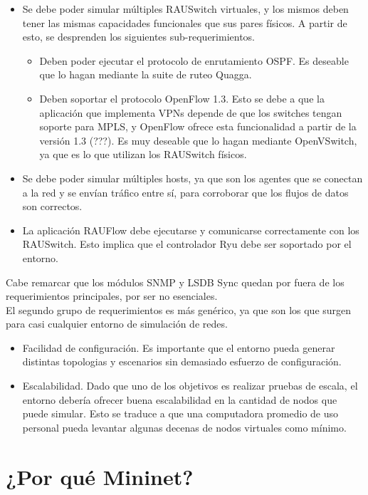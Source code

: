 \begin{itemize}
	\item Se debe poder simular múltiples RAUSwitch virtuales, y los mismos deben tener las mismas capacidades funcionales que sus pares físicos. A partir de esto, se desprenden los siguientes sub-requerimientos.
	\begin{itemize}
		\item Deben poder ejecutar el protocolo de enrutamiento OSPF. Es deseable que lo hagan mediante la suite de ruteo Quagga.
		\item Deben soportar el protocolo OpenFlow 1.3. Esto se debe a que la aplicación que implementa VPNs depende de que los switches tengan soporte para MPLS, y OpenFlow ofrece esta funcionalidad a partir de la versión 1.3 (???). Es muy deseable que lo hagan mediante OpenVSwitch, ya que es lo que utilizan los RAUSwitch físicos.
	\end{itemize}
	\item Se debe poder simular múltiples hosts, ya que son los agentes que se conectan a la red y se envían tráfico entre sí, para corroborar que los flujos de datos son correctos.
	\item La aplicación RAUFlow debe ejecutarse y comunicarse correctamente con los RAUSwitch. Esto implica que el controlador Ryu debe ser soportado por el entorno.
\end{itemize}

Cabe remarcar que los módulos SNMP y LSDB Sync quedan por fuera de los requerimientos principales, por ser no esenciales. \\

El segundo grupo de requerimientos es más genérico, ya que son los que surgen para casi cualquier entorno de simulación de redes.

\begin{itemize} 
	\item Facilidad de configuración. Es importante que el entorno pueda generar distintas topologias y escenarios sin demasiado esfuerzo de configuración.
	\item Escalabilidad. Dado que uno de los objetivos es realizar pruebas de escala, el entorno debería ofrecer buena escalabilidad en la cantidad de nodos que puede simular. Esto se traduce a que una computadora promedio de uso personal pueda levantar algunas decenas de nodos virtuales como mínimo.
\end{itemize}

\section{¿Por qué Mininet?}


